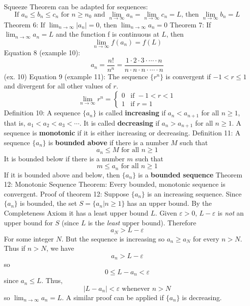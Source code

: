 \documentclass{article}
\begin{document}
\begin{outline}
        \1 Squeeze Theorem can be adapted for sequences: \[\text{If }a_n\leq b_n\leq c_n\text{ for }n\geq n_0\text{ and }\lim_{n\to\infty}a_n=\lim_{n\to\infty}c_n=L\text{, then }\lim_{n\to\infty}b_n=L\]
        \1 Theorem 6: \(\text{If }\lim_{n\to\infty}|a_n|=0\text{, then }\lim_{n\to\infty}a_n=0\)
        \1 Theorem 7: If \(\lim_{n\to\infty}a_n=L\) and the function f is continuous at $L$, then \[\lim_{n\to\infty}f(a_n)=f(L)\]
        \1 Equation 8 (example 10): \[a_n=\dfrac{n!}{n^n}=\dfrac{1\cdot2\cdot3\cdot\cdots\cdot n}{n\cdot n\cdot n\cdot\cdots\cdot n}\] (ex. 10)
        \1 Equation 9 (example 11): The sequence \(\{r^n\}\) is convergent if \(-1<r\leq 1\) and divergent for all other values of $r$. \[\lim_{n\to\infty}r^n=\begin{cases} 0 & \mbox{if } -1<r<1 \\ 1 & \mbox{if }r=1 \end{cases}\]
        \1 Definition 10: A sequence \(\{a_n\}\) is called \textbf{increasing} if \(a_n<a_{n+1}\) for all \(n\geq 1\), that is, \(a_1<a_2<a_3<\cdots\). It is called \textbf{decreasing} if \(a_n>a_{n+1}\) for all \(n\geq 1\). A sequence is \textbf{monotonic} if it is either increasing or decreasing. 
        \1 Definition 11: A sequence \(\{a_n\}\) is \textbf{bounded above} if there is a number $M$ such that \[a_n\leq M\mbox{    for all }n\geq 1\] It is bounded below if there is a number $m$ such that \[m\leq a_n\text{    for all }n\geq 1\] If it is bounded above and below, then \(\{a_n\}\) is a \textbf{bounded sequence}
        \1 Theorem 12: Monotonic Sequence Theorem: Every bounded, monotonic sequence is convergent. 
        \1 Proof of theorem 12: Suppose \(\{a_n\}\) is an increasing sequence. Since \(\{a_n\}\) is bounded, the set \(S=\{a_n|n\geq 1\}\) has an upper bound. By the Completeness Axiom it has a least upper bound $L$. Given \(\varepsilon>0\), \(L-\varepsilon\) is \textit{not} an upper bound for $S$ (since $L$ is the \textit{least} upper bound). Therefore \[a_N>L-\varepsilon\] For some integer $N$. But the sequence is increasing so \(a_n\geq a_N\) for every \(n>N\). Thus if \(n>N\), we have \[a_n>L-\varepsilon\] so \[0\leq L-a_n<\varepsilon\] since \(a_n\leq L\). Thus, \[|L-a_n|<\varepsilon\text{     whenever }n>N \] so \(\lim_{n\to\infty}a_n=L\). A similar proof can be applied if \(\{a_n\}\) is decreasing. 
    \end{outline}
\end{document}
